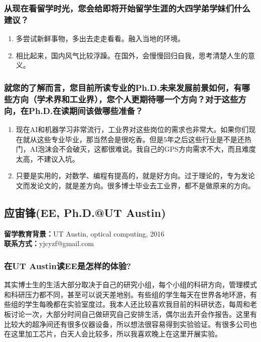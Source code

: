 \documentclass[a4paper,UTF8]{book}
\begin{document}
    \subsubsection*{从现在看留学时光，您会给即将开始留学生涯的大四学弟学妹们什么建议？}
        \begin{enumerate}[itemindent=0pt,itemsep=0pt,parsep=0pt]
            \item 多尝试新鲜事物，多出去走走看看。融入当地的环境。
            \item 相比起来，国内风气比较浮躁。在国外，会慢慢回归自我，思考清楚人生的意义。
        \end{enumerate}
    \subsubsection*{就您的了解而言，您目前所读专业的Ph.D.未来发展前景如何，有哪些方向（学术界和工业界），您个人更期待哪一个方向？对于这些方向，在Ph.D.在读期间该做哪些准备？}
        \begin{enumerate}[itemindent=0pt,itemsep=0pt,parsep=0pt]
            \item 现在AI和机器学习非常流行，工业界对这些岗位的需求也非常大。如果你们现在就从这些专业毕业，那当然会是很吃香。但是5年之后这些行业是不是还热门，AI泡沫会不会破灭，这都很难说。我自己的GPS方向需求不大，而且难度太高，不建议入坑。
            \item 只要是实用的，对数学、编程有提高的，就是好方向。过于理论的，专为发论文而发论文的，就是差方向。很多博士毕业去工业界，都不是做原来的方向。
        \end{enumerate}



\clearpage
\subsection{应宙锋(EE, Ph.D.@UT Austin)}
    \textbf{留学教育背景：}UT Austin, optical computing, 2016\\
    \textbf{联系方式：}yjcyzf@gmail.com

    \subsubsection*{在UT Austin读EE是怎样的体验?}
    其实博士生的生活大部分取决于自己的研究小组，每个小组的科研方向，管理模式和科研压力都不同，甚至可以说天差地别。有些组的学生每天在世界各地环游，有些组的学生每晚都在实验室度过。我本人还比较喜欢我目前的科研状态，每周和老板讨论一次，大部分时间自己做研究自己安排生活，偶尔出去开会作报告。这里有比较大的超净间还有很多仪器设备，所以想法很容易得到实验验证。有很多公司也在这里加工芯片，白天人会比较多，所以我喜欢晚上在这里开展实验。
    
\end{document}
